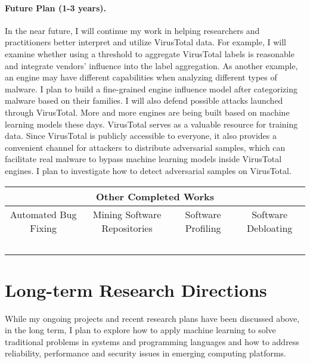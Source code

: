 \documentclass[10pt]{article}
\begin{document}
\paragraph{Future Plan (1-3 years).}
In the near future, I will continue my work in helping researchers and practitioners 
better interpret and utilize VirusTotal data. 
For example, I will examine whether using a threshold to aggregate VirusTotal labels   
is reasonable and integrate vendors' influence into the label aggregation. 
As another example, an engine may have different capabilities when analyzing 
different types of malware. I plan to build a fine-grained 
engine influence model after categorizing malware based on their families. 
I will also defend possible attacks launched through VirusTotal. 
More and more engines are being built based on machine learning models these days. 
VirusTotal serves as a valuable resource for training data.
Since VirusTotal is publicly accessible to everyone, it also provides 
a convenient channel for attackers to distribute adversarial samples, 
which can facilitate real malware to bypass machine learning 
models inside VirusTotal engines.
I plan to investigate how to detect adversarial samples on VirusTotal. 


\begin{table*}[th]
\centering
\begin{tabular}{|c|c|c|c|}
\hline
						\multicolumn{4}{|c|}{\textbf{Other Completed Works}}  \\ \hline
\multicolumn{1}{|c|}{Automated Bug Fixing}   & \multicolumn{1}{c|}{Mining Software Repositories} & \multicolumn{1}{c|}{Software Profiling} 		& \multicolumn{1}{c|}{Software Debloating} \\ \hline
 				~\cite{jin11afix}	   	    &              ~\cite{Gu15FSE}                                     &         ~\cite{icse-boqin}                              &  ~\cite{bangwen}~\cite{salad}        \\ \hline
\end{tabular}
\end{table*}

\section{Long-term Research Directions}

While my ongoing projects and recent research plans have been discussed above,
in the long term, I plan to explore how to apply machine learning to solve
traditional problems in systems and programming languages and 
how to address reliability, performance and security issues 
in emerging computing platforms. 
\end{document}
